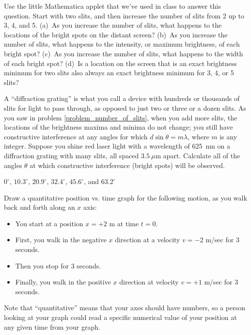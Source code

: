 \begin{Exercise}
Use the little Mathematica applet  that we've used in class to answer this question.  Start with two slits, and then increase the number of slits from 2 up to 3, 4, and 5.  (a)~As you increase the number of slits, what happens to the locations of the bright spots on the distant screen?  (b)~As you increase the number of slits, what happens to the intensity, or maximum brightness, of each bright spot?  (c)~As you increase the number of slits, what happens to the width of each bright spot?  (d)~Is a location on the screen that is an exact brightness minimum for two slits also always an exact brightness minimum for 3, 4, or 5 slits? \label{problem_number_of_slits}
\end{Exercise}

\begin{Exercise}
A ``diffraction grating'' is what you call a device with hundreds or thousands of slits for light to pass through, as opposed to just two or three or a dozen slits.  As you saw in problem \ref{problem_number_of_slits}, when you add more slits, the locations of the brightness maxima and minima do not change; you still have constructive interference at any angles for which 
$d \sin \theta = m\lambda$,
where $m$ is any integer.  
Suppose you shine red laser light with a wavelength of 625~nm on a diffraction grating with many slits, all spaced $3.5~\mu$m apart.
Calculate all of the angles $\theta$ at which constructive interference (bright spots) will be observed.
\end{Exercise}
\begin{Answer}
$0^\circ$, $10.3^\circ$, $20.9^\circ$, $32.4^\circ$, $45.6^\circ$, and $63.2^\circ$
\end{Answer}

\begin{Exercise}[difficulty=1]
Draw a quantitative position vs. time graph for the following motion, as you walk back and forth along an $x$ axis: 
\begin{itemize}[nosep]
\item You start at a position $x=+2$ m at time $t=0$.
\item First, you walk in the negative $x$ direction at a velocity $v=-2$ m/sec for 3 seconds.
\item Then you stop for 3 seconds.
\item Finally, you walk in the positive $x$ direction at velocity $v=+1$ m/sec for 3 seconds.
\end{itemize}
Note that ``quantitative'' means that your axes should have numbers, so a person looking at your graph could read a specific numerical value of your position at any given time from your graph.
\end{Exercise}


